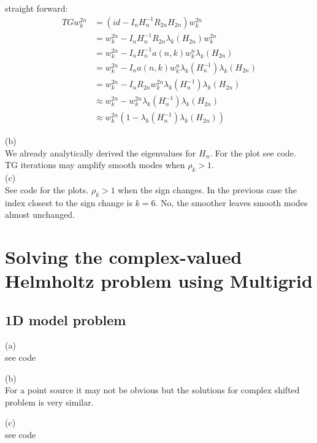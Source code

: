 \documentclass[a4paper,12pt]{article}
\begin{document}
straight forward:
\begin{align*}
    TG w_{k}^{2n} & = (id - I_{n} H_{n}^{-1} R_{2n} H_{2n}) w_{k}^{2n}                                    \\
                  & =  w_{k}^{2n} - I_{n} H_{n}^{-1} R_{2n} \lambda_{k}(H_{2n}) w_{k}^{2n}                \\
                  & =  w_{k}^{2n} - I_{n} H_{n}^{-1}  a(n,k) w_{k}^{n} \lambda_{k}(H_{2n})                \\
                  & =  w_{k}^{2n} - I_{n}  a(n,k) w_{k}^{n} \lambda_{k}(H_{n}^{-1})  \lambda_{k}(H_{2n})  \\
                  & =  w_{k}^{2n} - I_{n}  R_{2n} w_{k}^{2n} \lambda_{k}(H_{n}^{-1})  \lambda_{k}(H_{2n}) \\
                  & \approx  w_{k}^{2n} -  w_{k}^{2n} \lambda_{k}(H_{n}^{-1})  \lambda_{k}(H_{2n})        \\
                  & \approx  w_{k}^{2n} (1-   \lambda_{k}(H_{n}^{-1})  \lambda_{k}(H_{2n}))
\end{align*}

(b) \\
We already analytically derived the eigenvalues for $H_{n}$. For the plot see code.\\
TG iterations may amplify smooth modes when $\rho_{k} >1$. \\
(c)\\
See code for the plots. $\rho_{k} >1$ when the sign changes. In the previous case the
index closest to the sign change is $k = 6$. No, the smoother leaves smooth modes almost unchanged.



\section{Solving the complex-valued Helmholtz problem using Multigrid}


\subsection{1D model problem}
(a) \\
see code

(b)\\
For a point source it may not be obvious but the solutions
for complex shifted problem is very similar.

(c) \\
see code
\end{document}
